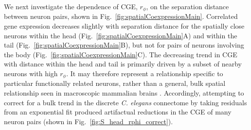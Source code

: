 \documentclass[10pt,letterpaper]{article}
\begin{document}
We next investigate the dependence of CGE, $r_\phi$, on the separation distance between neuron pairs, shown in Fig.~\ref{fig:spatialCoexpressionMain}.
Correlated gene expression decreases slightly with separation distance for the spatially close neurons within the head (Fig.~\ref{fig:spatialCoexpressionMain}A) and within the tail (Fig.~\ref{fig:spatialCoexpressionMain}B), but not for pairs of neurons involving the body (Fig.~\ref{fig:spatialCoexpressionMain}C).
The decreasing trend in CGE with distance within the head and tail is primarily driven by a subset of nearby neurons with high $r_\phi$.
It may therefore represent a relationship specific to particular functionally related neurons, rather than a general, bulk spatial relationship seen in macroscopic mammalian brains \cite{Fulcher:2016ck}.
Accordingly, attempting to correct for a bulk trend in the discrete \emph{C. elegans} connectome by taking residuals from an exponential fit produced artifactual reductions in the CGE of many neuron pairs (shown in Fig.~\ref{fig:S_head_rphi_correct}).
\end{document}
